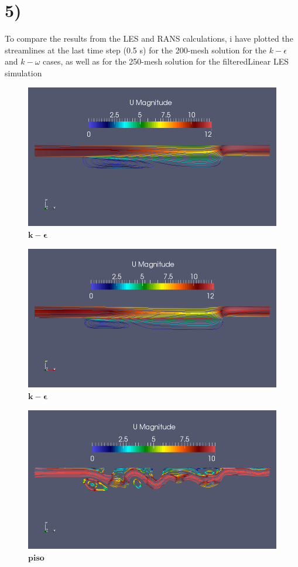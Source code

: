 \documentclass[a4paper,english,12pt,twoside]{article}
\begin{document}
\section*{5)}
To compare the results from the LES and RANS calculations, i have plotted the streamlines at the last time step (0.5 s) for the 200-mesh solution for the $k-\epsilon$ and $k-\omega$ cases, as well as for the 250-mesh solution for the filteredLinear LES simulation\\
\newpage
\begin{figure}[h!]
	\centering
	\includegraphics[scale=0.35]{simple_ke_20_streamlines.png}
	\caption{$\mathbf{k-\epsilon}$}
\end{figure}
\begin{figure}[h!]
	\centering
	\includegraphics[scale=0.35]{simple_ko_20_streamlines.png}
	\caption{$\mathbf{k-\epsilon}$}
\end{figure}
\begin{figure}[h!]
	\centering
	\includegraphics[scale=0.35]{piso_25_filteredLinear_streamlines.png}
	\caption{$\mathbf{piso}$}
\end{figure}
\end{document}
